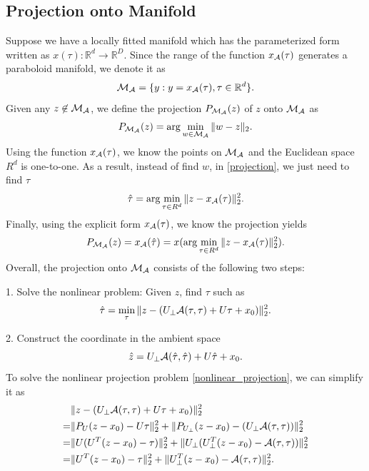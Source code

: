 \documentclass{article}
\theoremstyle{remark}
\begin{document}
\subsection{Projection onto Manifold}
Suppose we have a locally fitted manifold which has the parameterized form written as $x(\tau): {\mathbb R}^d\rightarrow {\mathbb R}^D$.
Since the range of the function $x_{\cal A}(\tau)$ generates a paraboloid manifold, we denote it as 
\[
{\cal M}_{\cal A} = \{y: y = x_{\cal A}(\tau), \tau\in {\mathbb R}^d\}.
\]
Given any $z\not\in{\cal M}_{\cal A}$, we define the projection $P_{{\cal M}_{\cal A}}(z)$  of $z$ onto ${\cal M}_{\cal A}$ as
\begin{equation}\label{projection}
P_{{\cal M}_{\cal A}}(z) = \arg\min_{w \in {\cal M}_{\cal A} }\|w-z\|_2.
\end{equation}
Using the function $x_{\cal A}(\tau)$, we know the points on ${\cal M}_{\cal A}$ and the Euclidean space $R^d$ is one-to-one. As a result, instead of find $w$, in \eqref{projection}, we just need to find $\tau$
\begin{equation}\label{projection_tau}
 \hat{\tau} = \arg\min_{\tau\in R^d }\|z-x_{\cal A}(\tau)\|_2^2.
\end{equation}
Finally, using the explicit form $x_{\cal A}(\tau)$, we know the projection yields
\[
P_{{\cal M}_{\cal A}}(z) = x_{\cal A}(\hat{\tau})=x(\arg\min_{\tau\in R^d }\|z-x_{\cal A}(\tau)\|_2^2).
\]
Overall, the projection onto ${\cal M}_{\cal A}$ consists of the following two steps:

1. Solve the nonlinear problem: Given $z$, find $\tau$ such as 
\begin{equation}\label{nonlinear_projection}
\hat{\tau} = \min_\tau \|z -  (U_{\perp} {\cal A} (\tau,\tau) + U \tau +x_0)\|_2^2.
\end{equation}

2. Construct the coordinate in the ambient space
\[
\hat{z} = U_{\perp} {\cal A} (\hat{\tau},\hat{\tau}) + U \hat{\tau} +x_0.
\]
To solve the nonlinear projection problem \eqref{nonlinear_projection}, we can simplify it as
\begin{equation}\label{simiplified_nonlinear}
\begin{aligned}
   &\|z -  (U_{\perp} {\cal A} (\tau,\tau) + U \tau +x_0)\|_2^2\\
 =&\|P_U(z-x_0)-U\tau\|_2^2+\|P_{U_{\perp}}(z-x_0)-(U_{\perp} {\cal A}(\tau,\tau))\|_2^2 \\
  =&\|U (U^T (z-x_0)-\tau)\|_2^2+\|U_\perp (U_{\perp}^T(z-x_0)- {\cal A}(\tau,\tau))\|_2^2 \\
 =&\|U^T (z-x_0)-\tau\|_2^2+\|U^T_{\perp}(z-x_0)- {\cal A} (\tau,\tau)\|_2^2.
\end{aligned}
\end{equation}
\end{document}
